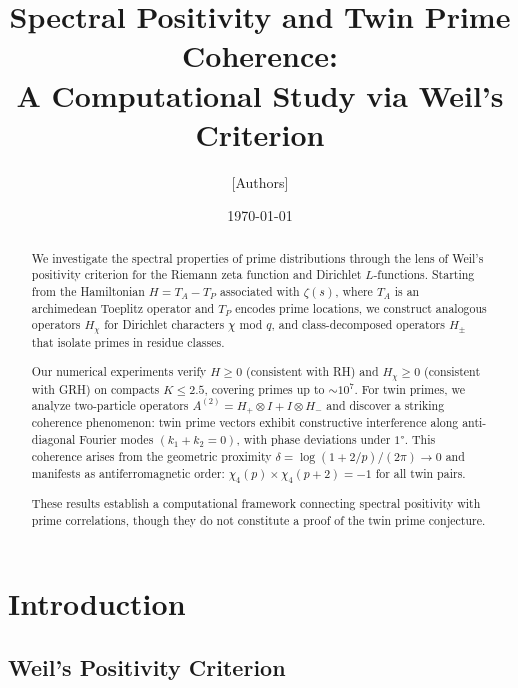 \documentclass[11pt,a4paper]{article}
\title{Spectral Positivity and Twin Prime Coherence:\\
A Computational Study via Weil's Criterion}
\author{[Authors]}
\date{\today}
\theoremstyle{definition}
\begin{document}
\maketitle

\begin{center}
\end{center}

\begin{abstract}
We investigate the spectral properties of prime distributions through the lens of Weil's positivity criterion for the Riemann zeta function and Dirichlet $L$-functions. Starting from the Hamiltonian $H = T_A - T_P$ associated with $\zeta(s)$, where $T_A$ is an archimedean Toeplitz operator and $T_P$ encodes prime locations, we construct analogous operators $H_\chi$ for Dirichlet characters $\chi$ mod $q$, and class-decomposed operators $H_\pm$ that isolate primes in residue classes.

Our numerical experiments verify $H \geq 0$ (consistent with RH) and $H_\chi \geq 0$ (consistent with GRH) on compacts $K \leq 2.5$, covering primes up to $\sim 10^7$. For twin primes, we analyze two-particle operators $A^{(2)} = H_+ \otimes I + I \otimes H_-$ and discover a striking coherence phenomenon: twin prime vectors exhibit constructive interference along anti-diagonal Fourier modes $(k_1 + k_2 = 0)$, with phase deviations under $1°$. This coherence arises from the geometric proximity $\delta = \log(1+2/p)/(2\pi) \to 0$ and manifests as antiferromagnetic order: $\chi_4(p) \times \chi_4(p+2) = -1$ for all twin pairs.

These results establish a computational framework connecting spectral positivity with prime correlations, though they do not constitute a proof of the twin prime conjecture.
\end{abstract}

\section{Introduction}

\subsection{Weil's Positivity Criterion}
\end{document}
